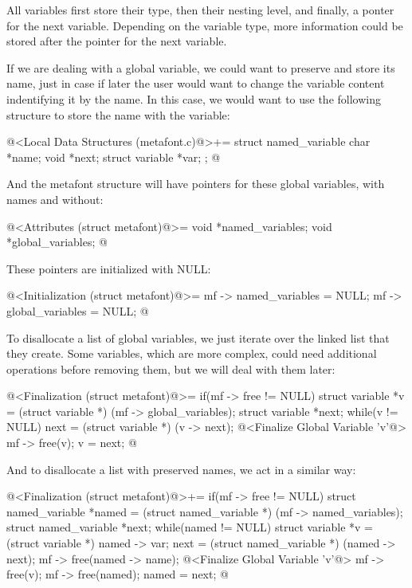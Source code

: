 All variables first store their type, then their nesting level, and
finally, a ponter for the next variable. Depending on the variable
type, more information could be stored after the pointer for the next
variable.

If we are dealing with a global variable, we could want to preserve
and store its name, just in case if later the user would want to
change the variable content indentifying it by the name. In this case,
we would want to use the following structure to store the name with
the variable:

\iniciocodigo
@<Local Data Structures (metafont.c)@>+=
struct named_variable{
  char *name;
  void *next;
  struct variable *var;
};
@
\fimcodigo

And the metafont structure will have pointers for these global
variables, with names and without:

\iniciocodigo
@<Attributes (struct metafont)@>=
  void *named_variables;
  void *global_variables;
@
\fimcodigo

These pointers are initialized with NULL:

\iniciocodigo
@<Initialization (struct metafont)@>=
mf -> named_variables = NULL;
mf -> global_variables = NULL;
@
\fimcodigo

To disallocate a list of global variables, we just iterate over the
linked list that they create. Some variables, which are more complex,
could need additional operations before removing them, but we will
deal with them later:

\iniciocodigo
@<Finalization (struct metafont)@>=
if(mf -> free != NULL){
  struct variable *v = (struct variable *) (mf -> global_variables);
  struct variable *next;
  while(v != NULL){
    next = (struct variable *) (v -> next);
    @<Finalize Global Variable 'v'@>
    mf -> free(v);
    v = next;
  }
}
@
\fimcodigo

And to disallocate a list with preserved names, we act in a similar
way:

\iniciocodigo
@<Finalization (struct metafont)@>+=
if(mf -> free != NULL){
  struct named_variable *named = (struct named_variable *)
                                   (mf -> named_variables);
  struct named_variable *next;
  while(named != NULL){
    struct variable *v = (struct variable *) named -> var;
    next = (struct named_variable *) (named -> next);
    mf -> free(named -> name);
    @<Finalize Global Variable 'v'@>
    mf -> free(v);
    mf -> free(named);
    named = next;
  }
}
@
\fimcodigo

